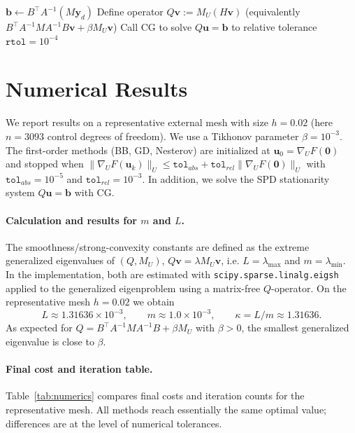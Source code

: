 \documentclass[11pt,a4paper]{article}
\newcommand{\meshhtoken}{0.02}
\begin{document}
\begin{algorithm}
\caption{CG for $Q\mathbf{u}=\mathbf{b}$ (matrix-free)}\label{alg:cg}
$\mathbf{b} \gets B^\top A^{-1}(M\mathbf{y}_d)$\;
Define operator $Q\mathbf{v} := M_U(H\mathbf{v})$ (equivalently $B^\top A^{-1} M A^{-1} B\mathbf{v} + \beta M_U\mathbf{v}$)\;
Call CG to solve $Q\mathbf{u}=\mathbf{b}$ to relative tolerance $\texttt{rtol}=10^{-4}$\;
\end{algorithm}

\section{Numerical Results}
We report results on a representative external mesh with size $h=\meshhtoken$ (here $n=3093$ control degrees of freedom). We use a Tikhonov parameter $\beta=10^{-3}$. The first-order methods (BB, GD, Nesterov) are initialized at $\mathbf{u}_0=\nabla_U F(\mathbf{0})$ and stopped when $\|\nabla_U F(\mathbf{u}_k)\|_U \le \texttt{tol}_{abs}+\texttt{tol}_{rel}\|\nabla_U F(\mathbf{0})\|_U$ with $\texttt{tol}_{abs}=10^{-5}$ and $\texttt{tol}_{rel}=10^{-3}$. In addition, we solve the SPD stationarity system $Q\mathbf{u}=\mathbf{b}$ with CG.

\paragraph{Calculation and results for $m$ and $L$.}
The smoothness/strong-convexity constants are defined as the extreme generalized eigenvalues of $(Q,M_U)$,
\(Q\mathbf{v}=\lambda M_U\mathbf{v}\), i.e. $L=\lambda_{\max}$ and $m=\lambda_{\min}$. In the implementation, both are estimated with \texttt{scipy.sparse.linalg.eigsh} applied to the generalized eigenproblem using a matrix-free $Q$-operator.
On the representative mesh $h=0.02$ we obtain
\[
  L \approx 1.31636\times 10^{-3},\qquad m \approx 1.0\times 10^{-3},\qquad \kappa = L/m \approx 1.31636.
\]
As expected for $Q=B^\top A^{-1}MA^{-1}B + \beta M_U$ with $\beta>0$, the smallest generalized eigenvalue is close to $\beta$.

\paragraph{Final cost and iteration table.}
Table~\ref{tab:numerics} compares final costs and iteration counts for the representative mesh. All methods reach essentially the same optimal value; differences are at the level of numerical tolerances.
\end{document}
